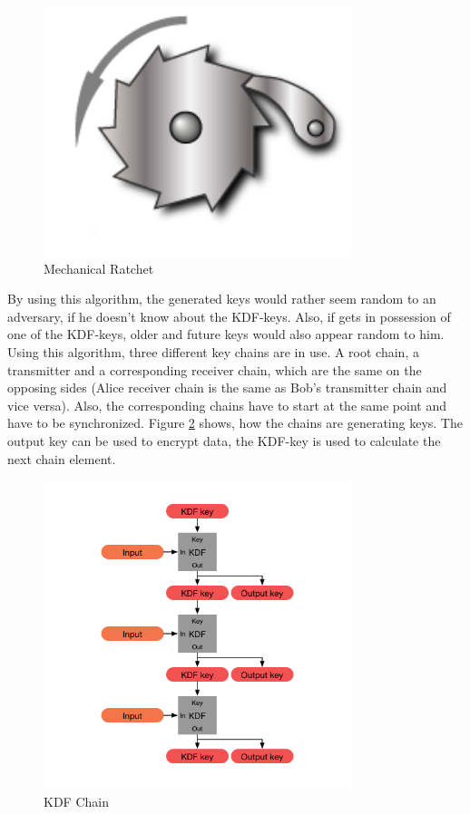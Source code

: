 \documentclass[12pt,oneside,a4paper,parskip]{scrbook}
\begin{document}
\begin{figure}[ht]
	\centering
  \includegraphics[width=0.8\textwidth]{ressources/ratchet.png}
  \caption{Mechanical Ratchet \parencite{pawl_rachet_2020}}
  \label{fig:ratchet}
\end{figure}

By using this algorithm, the generated keys would rather seem random to an adversary, if he doesn't know about the KDF-keys. Also, if gets in possession of one of the KDF-keys, older and future keys would also appear random to him. Using this algorithm, three different key chains are in use. A root chain, a transmitter and a corresponding receiver chain, which are the same on the opposing sides (Alice receiver chain is the same as Bob's transmitter chain and vice versa). Also, the corresponding chains have to start at the same point and have to be synchronized. Figure \ref{fig:KDF_Chain} shows, how the chains are generating keys. The output key can be used to encrypt data, the KDF-key is used to calculate the next chain element.
\parencite{perrin_double_2016}

\begin{figure}[ht]
	\centering
  \includegraphics[width=0.8\textwidth]{ressources/kdf_chain.png}
  \caption{KDF Chain \parencite{perrin_double_2016}}
  \label{fig:KDF_Chain}
\end{figure}
\end{document}
